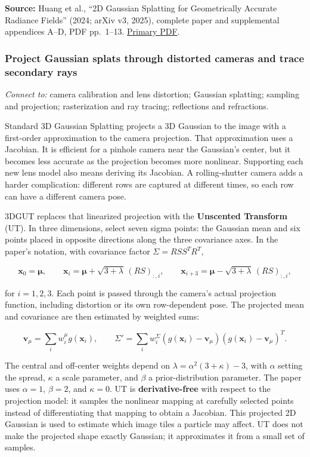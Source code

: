 \textbf{Source:} Huang et al., ``2D Gaussian Splatting for Geometrically Accurate Radiance Fields'' (2024; arXiv v3, 2025), complete paper and supplemental appendices A--D, PDF pp.~1--13. \href{https://arxiv.org/pdf/2403.17888}{Primary PDF}.

\subsubsection{Project Gaussian splats through distorted cameras and trace secondary rays}\label{04-visual-computing-ii-ch034-project-gaussian-splats-through-distorted-cameras-and-trace-secondary-rays}

\hypertarget{04-visual-computing-ii-ch034-project-gaussian-splats-through-distorted-cameras-and-trace-secondary-rays}{}

\emph{Connect to:} camera calibration and lens distortion; Gaussian splatting; sampling and projection; rasterization and ray tracing; reflections and refractions.

Standard 3D Gaussian Splatting projects a 3D Gaussian to the image with a first-order approximation to the camera projection. That approximation uses a Jacobian. It is efficient for a pinhole camera near the Gaussian's center, but it becomes less accurate as the projection becomes more nonlinear. Supporting each new lens model also means deriving its Jacobian. A rolling-shutter camera adds a harder complication: different rows are captured at different times, so each row can have a different camera pose.

3DGUT replaces that linearized projection with the \textbf{Unscented Transform} (UT). In three dimensions, select seven sigma points: the Gaussian mean and six points placed in opposite directions along the three covariance axes. In the paper's notation, with covariance factor \(\Sigma=RSS^TR^T\),

\[\mathbf{x}_0=\boldsymbol\mu,\qquad \mathbf{x}_{i}=\boldsymbol\mu+\sqrt{3+\lambda}\,(RS)_{:,i},\qquad \mathbf{x}_{i+3}=\boldsymbol\mu-\sqrt{3+\lambda}\,(RS)_{:,i},\]

for \(i=1,2,3\). Each point is passed through the camera's actual projection function, including distortion or its own row-dependent pose. The projected mean and covariance are then estimated by weighted sums:

\[\mathbf{v}_\mu=\sum_i w_i^\mu g(\mathbf{x}_i),\qquad \Sigma'=\sum_i w_i^\Sigma(g(\mathbf{x}_i)-\mathbf{v}_\mu)(g(\mathbf{x}_i)-\mathbf{v}_\mu)^T.\]

The central and off-center weights depend on \(\lambda=\alpha^2(3+\kappa)-3\), with \(\alpha\) setting the spread, \(\kappa\) a scale parameter, and \(\beta\) a prior-distribution parameter. The paper uses \(\alpha=1\), \(\beta=2\), and \(\kappa=0\). UT is \textbf{derivative-free} with respect to the projection model: it samples the nonlinear mapping at carefully selected points instead of differentiating that mapping to obtain a Jacobian. This projected 2D Gaussian is used to estimate which image tiles a particle may affect. UT does not make the projected shape exactly Gaussian; it approximates it from a small set of samples.

